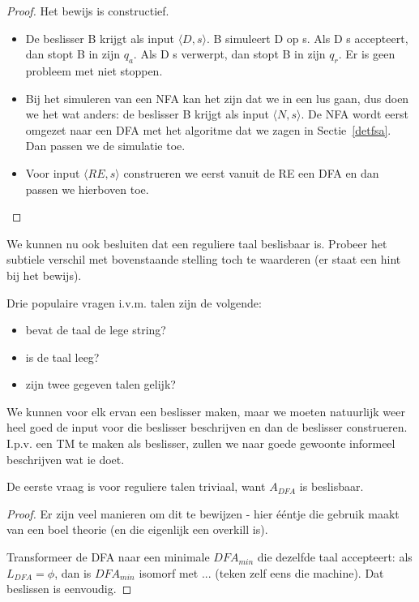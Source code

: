 \begin{proof} Het bewijs is constructief.
\begin{itemize}
\item 
De beslisser B krijgt als input $\langle D,s \rangle$. B simuleert D op s. Als
D s accepteert, dan stopt B in zijn $q_a$. Als D s verwerpt,
dan stopt B in zijn $q_r$. Er is geen probleem met niet stoppen.

\item 
Bij het simuleren van een NFA kan het zijn dat we in een lus gaan, dus
doen we het wat anders: de beslisser B krijgt als input $\langle N,s \rangle$. De
NFA wordt eerst omgezet naar een DFA met het algoritme dat we zagen in
Sectie~\ref{detfsa}. Dan passen we de simulatie toe.

\item
Voor input $\langle RE,s \rangle$ construeren we eerst vanuit de RE een DFA en dan
passen we hierboven toe.

\end{itemize}
\end{proof}


We kunnen nu ook besluiten dat een reguliere taal beslisbaar
is. Probeer het subtiele verschil met bovenstaande stelling toch
te waarderen (er staat een hint bij het bewijs).

Drie populaire vragen i.v.m. talen zijn de volgende:
\begin{itemize}
\item bevat de taal de lege string?
\item is de taal leeg?
\item zijn twee gegeven talen gelijk?
\end{itemize}


We kunnen voor elk ervan een beslisser maken, maar we moeten
natuurlijk weer heel goed de input voor die beslisser beschrijven en
dan de beslisser construeren. I.p.v. een TM te maken als beslisser,
zullen we naar goede gewoonte informeel beschrijven wat ie doet.


De eerste vraag is voor reguliere talen triviaal, want $A_{DFA}$ is
beslisbaar.


\begin{proof}
Er zijn veel manieren om dit te bewijzen - hier \'{e}\'{e}ntje die
gebruik maakt van een boel theorie (en die eigenlijk een overkill is).


Transformeer de DFA naar een minimale $DFA_{min}$ die dezelfde taal
accepteert: als $L_{DFA} = \phi$, dan is $DFA_{min}$ isomorf met
... (teken zelf eens die machine). Dat beslissen is eenvoudig.
\end{proof}



